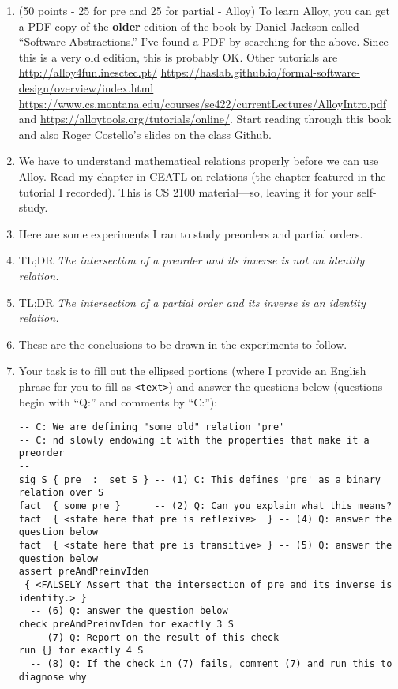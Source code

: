 \documentclass[11pt]{article}
\begin{document}
\begin{enumerate}
  
\item (50 points - 25 for pre and 25 for partial - Alloy)
  To learn Alloy, you can get a PDF copy of the {\bf older} edition of the book
  by Daniel Jackson called ``Software Abstractions.''
  I've found a PDF by searching for the above.
  Since this is a very old edition,
  this is probably OK.
  Other tutorials are
  \url{http://alloy4fun.inesctec.pt/}
  \url{https://haslab.github.io/formal-software-design/overview/index.html}
  \url{https://www.cs.montana.edu/courses/se422/currentLectures/AlloyIntro.pdf} and
  \url{https://alloytools.org/tutorials/online/}.
  Start reading through this book and also Roger Costello's slides
  on the class Github.
  
\item[]  We have to understand mathematical relations properly before
  we can use Alloy.
  Read my chapter in CEATL on relations (the chapter featured
  in the tutorial I recorded).
  This is CS 2100 material---so, leaving it for your self-study.

\item[]    Here are some experiments I ran to study preorders and partial orders.
\item[] TL;DR {\em The intersection of a preorder and its inverse is not an
  identity relation.}
\item[] TL;DR {\em The intersection of a partial order and its inverse is  an
   identity relation.}  
\item[] These are the conclusions to be drawn in the experiments to follow.
  
\item[]  Your task is to fill out
    the ellipsed portions (where I provide an English phrase
    for you to fill as \verb|<text>|) and answer the questions below
    (questions begin with ``Q:'' and comments by ``C:''):

    \begin{footnotesize}
\begin{verbatim}
-- C: We are defining "some old" relation 'pre'
-- C: nd slowly endowing it with the properties that make it a preorder
--
sig S { pre  :  set S } -- (1) C: This defines 'pre' as a binary relation over S
fact  { some pre }      -- (2) Q: Can you explain what this means? 
fact  { <state here that pre is reflexive>  } -- (4) Q: answer the question below
fact  { <state here that pre is transitive> } -- (5) Q: answer the question below
assert preAndPreinvIden
 { <FALSELY Assert that the intersection of pre and its inverse is identity.> }
  -- (6) Q: answer the question below
check preAndPreinvIden for exactly 3 S
  -- (7) Q: Report on the result of this check
run {} for exactly 4 S
  -- (8) Q: If the check in (7) fails, comment (7) and run this to diagnose why
\end{verbatim}
    \end{footnotesize}
    

\end{enumerate}
\end{document}

